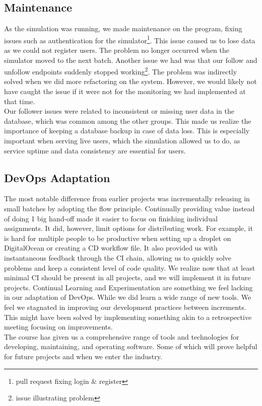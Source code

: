 \subsection{Maintenance}
As the simulation was running, we made maintenance on the program, fixing issues such as authentication for the simulator\footnote{pull request fixing login \& register\cite{loginIssue}}.
This issue caused us to lose data as we could not register users. The problem no longer occurred when the simulator moved to the next batch.
Another issue we had was that our follow and unfollow endpoints suddenly stopped working\footnote{issue illustrating problem\cite{issue172}}. The problem was indirectly solved when we did more refactoring on the system. However, we would likely not have caught the issue if it were not for the monitoring we had implemented at that time.\\
Our follower issues were related to inconsistent or missing user data in the database, which was common among the other groups. This made us realize the importance of keeping a database backup in case of data loss. This is especially important when serving live users, which the simulation allowed us to do, as service uptime and data consistency are essential for users.

\subsection{DevOps Adaptation}
The most notable difference from earlier projects was incrementally releasing in small batches by adopting the flow principle. Continually providing value instead of doing 1 big hand-off made it easier to focus on finishing individual assignments. It did, however, limit options for distributing work. For example, it is hard for multiple people to be productive when setting up a droplet on DigitalOcean or creating a CD workflow file. 
It also provided us with instantaneous feedback through the CI chain, allowing us to quickly solve problems and keep a consistent level of code quality. We realize now that at least minimal CI should be present in all projects, and we will implement it in future projects.
Continual Learning and Experimentation are something we feel lacking in our adaptation of DevOps. While we did learn a wide range of new tools. We feel we stagnated in improving our development practices between increments. This might have been solved by implementing something akin to a retrospective meeting focusing on improvements.\\
The course has given us a comprehensive range of tools and technologies for developing, maintaining, and operating software. Some of which will prove helpful for future projects and when we enter the industry.